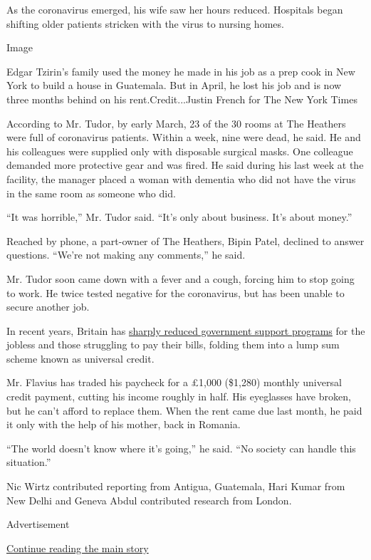 As the coronavirus emerged, his wife saw her hours reduced. Hospitals
began shifting older patients stricken with the virus to nursing homes.

Image

Edgar Tzirin's family used the money he made in his job as a prep cook
in New York to build a house in Guatemala. But in April, he lost his job
and is now three months behind on his rent.Credit...Justin French for
The New York Times

According to Mr. Tudor, by early March, 23 of the 30 rooms at The
Heathers were full of coronavirus patients. Within a week, nine were
dead, he said. He and his colleagues were supplied only with disposable
surgical masks. One colleague demanded more protective gear and was
fired. He said during his last week at the facility, the manager placed
a woman with dementia who did not have the virus in the same room as
someone who did.

``It was horrible,'' Mr. Tudor said. ``It's only about business. It's
about money.''

Reached by phone, a part-owner of The Heathers, Bipin Patel, declined to
answer questions. ``We're not making any comments,'' he said.

Mr. Tudor soon came down with a fever and a cough, forcing him to stop
going to work. He twice tested negative for the coronavirus, but has
been unable to secure another job.

In recent years, Britain has
\href{https://www.nytimes.com/2018/05/28/world/europe/uk-austerity-poverty.html}{sharply
reduced government support programs} for the jobless and those
struggling to pay their bills, folding them into a lump sum scheme known
as universal credit.

Mr. Flavius has traded his paycheck for a £1,000 (\$1,280) monthly
universal credit payment, cutting his income roughly in half. His
eyeglasses have broken, but he can't afford to replace them. When the
rent came due last month, he paid it only with the help of his mother,
back in Romania.

``The world doesn't know where it's going,'' he said. ``No society can
handle this situation.''

Nic Wirtz contributed reporting from Antigua, Guatemala, Hari Kumar from
New Delhi and Geneva Abdul contributed research from London.

Advertisement

\protect\hyperlink{after-bottom}{Continue reading the main story}

